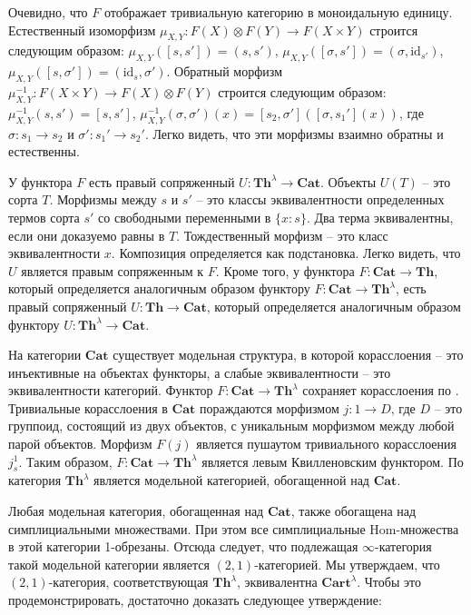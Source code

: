 \documentclass[reqno]{amsart}
\theoremstyle{definition}
\theoremstyle{remark}
\newcommand{\bcat}[1]{\mathbf{#1}}
\newcommand{\fs}[1]{\mathrm{#1}}
\newcommand{\Hom}{\fs{Hom}}
\newcommand{\Th}{\bcat{Th}}
\newcommand{\Cat}{\bcat{Cat}}
\begin{document}
Очевидно, что $F$ отображает тривиальную категорию в моноидальную единицу.
Естественный изоморфизм $\mu_{X,Y} : F(X) \otimes F(Y) \to F(X \times Y)$ строится следующим образом: $\mu_{X,Y}([s,s']) = (s,s')$, $\mu_{X,Y}([\sigma,s']) = (\sigma,\fs{id}_{s'})$, $\mu_{X,Y}([s,\sigma']) = (\fs{id}_s,\sigma')$.
Обратный морфизм $\mu_{X,Y}^{-1} : F(X \times Y) \to F(X) \otimes F(Y)$ строится следующим образом: $\mu_{X,Y}^{-1}(s,s') = [s,s']$, $\mu_{X,Y}^{-1}(\sigma,\sigma')(x) = [s_2,\sigma']([\sigma,s_1'](x))$, где $\sigma : s_1 \to s_2$ и $\sigma' : s_1' \to s_2'$.
Легко видеть, что эти морфизмы взаимно обратны и естественны.

У функтора $F$ есть правый сопряженный $U : \Th^\lambda \to \Cat$.
Объекты $U(T)$ -- это сорта $T$.
Морфизмы между $s$ и $s'$ -- это классы эквивалентности определенных термов сорта $s'$ со свободными переменными в $\{ x : s \}$.
Два терма эквивалентны, если они доказуемо равны в $T$.
Тождественный морфизм -- это класс эквивалентности $x$.
Композиция определяется как подстановка.
Легко видеть, что $U$ является правым сопряженным к $F$.
Кроме того, у функтора $F : \Cat \to \Th$, который определяется аналогичным образом функтору $F : \Cat \to \Th^\lambda$, есть правый сопряженный $U : \Th \to \Cat$, который определяется аналогичным образом функтору $U : \Th^\lambda \to \Cat$.

На категории $\Cat$ существует модельная структура, в которой корасслоения -- это инъективные на объектах функторы, а слабые эквивалентности -- это эквивалентности категорий.
Функтор $F : \Cat \to \Th^\lambda$ сохраняет корасслоения по .
Тривиальные корасслоения в $\Cat$ пораждаются морфизмом $j : 1 \to D$, где $D$ -- это группоид, состоящий из двух объектов, с уникальным морфизмом между любой парой объектов.
Морфизм $F(j)$ является пушаутом тривиального корасслоения $j_s^1$.
Таким образом, $F : \Cat \to \Th^\lambda$ является левым Квилленовским функтором.
По \cite[Proposition~3.8]{enriched-model-cats} категория $\Th^\lambda$ является модельной категорией, обогащенной над $\Cat$.

Любая модельная категория, обогащенная над $\Cat$, также обогащена над симплициальными множествами.
При этом все симплициальные $\Hom$-множества в этой категории 1-обрезаны.
Отсюда следует, что подлежащая $\infty$-категория такой модельной категории является $(2,1)$-категорией.
Мы утверждаем, что $(2,1)$-категория, соответствующая $\Th^\lambda$, эквивалентна $\bcat{Cart}^\lambda$.
Чтобы это продемонстрировать, достаточно доказать следующее утверждение:
\end{document}

